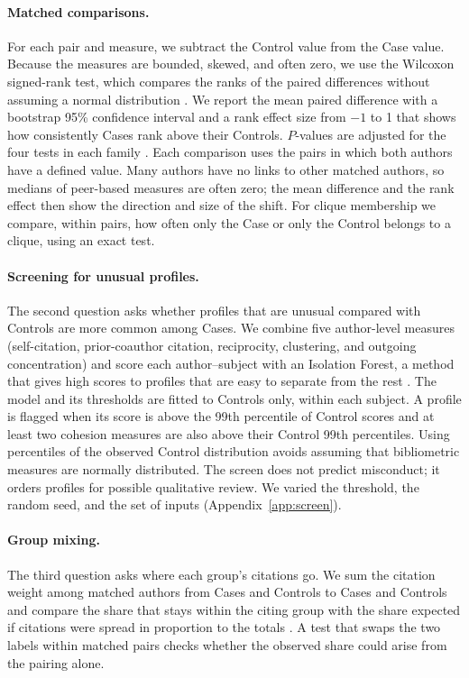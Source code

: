 \documentclass[12pt]{article}
\begin{document}
\paragraph{Matched comparisons.}  For each pair and measure, we subtract the Control value from the Case value.  Because the measures are bounded, skewed, and often zero, we use the Wilcoxon signed-rank test, which compares the ranks of the paired differences without assuming a normal distribution \parencite{Wilcoxon1945}.  We report the mean paired difference with a bootstrap 95\% confidence interval \parencite{Efron1993} and a rank effect size from $-1$ to 1 that shows how consistently Cases rank above their Controls.  $P$-values are adjusted for the four tests in each family \parencite{Benjamini1995}.  Each comparison uses the pairs in which both authors have a defined value.  Many authors have no links to other matched authors, so medians of peer-based measures are often zero; the mean difference and the rank effect then show the direction and size of the shift.  For clique membership we compare, within pairs, how often only the Case or only the Control belongs to a clique, using an exact test.

\paragraph{Screening for unusual profiles.}  The second question asks whether profiles that are unusual compared with Controls are more common among Cases.  We combine five author-level measures (self-citation, prior-coauthor citation, reciprocity, clustering, and outgoing concentration) and score each author--subject with an Isolation Forest, a method that gives high scores to profiles that are easy to separate from the rest \parencite{Liu2008}.  The model and its thresholds are fitted to Controls only, within each subject.  A profile is flagged when its score is above the 99th percentile of Control scores and at least two cohesion measures are also above their Control 99th percentiles.  Using percentiles of the observed Control distribution avoids assuming that bibliometric measures are normally distributed.  The screen does not predict misconduct; it orders profiles for possible qualitative review.  We varied the threshold, the random seed, and the set of inputs (Appendix~\ref{app:screen}).

\paragraph{Group mixing.}  The third question asks where each group's citations go.  We sum the citation weight among matched authors from Cases and Controls to Cases and Controls and compare the share that stays within the citing group with the share expected if citations were spread in proportion to the totals \parencite{Newman2002}.  A test that swaps the two labels within matched pairs checks whether the observed share could arise from the pairing alone.
\end{document}
